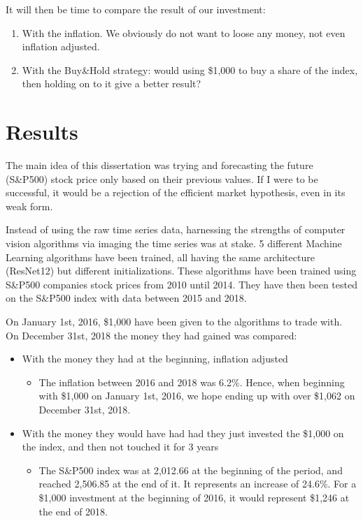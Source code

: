 \documentclass[11pt]{article}
\begin{document}
\begin{onehalfspace}
It will then be time to compare the result of our investment:

\begin{enumerate}
    \item With the inflation. We obviously do not want to loose any money, not even inflation adjusted.
    \item With the Buy\&Hold strategy: would using \$1,000 to buy a share of the index, then holding on to it give a better result?
\end{enumerate}

\pagebreak

\section{Results}
\label{results}

The main idea of this dissertation was trying and forecasting the future (S\&P500) stock price only based on their previous values. If I were to be successful, it would be a rejection of the efficient market hypothesis, even in its weak form. 

Instead of using the raw time series data, harnessing the strengths of computer vision algorithms via imaging the time series was at stake. 5 different Machine Learning algorithms have been trained, all having the same architecture (ResNet12) but different initializations. These algorithms have been trained using S\&P500 companies stock prices from 2010 until 2014. They have then been tested on the S\&P500 index with data between 2015 and 2018.

On January 1st, 2016, \$1,000 have been given to the algorithms to trade with. On December 31st, 2018 the money they had gained was compared:

\begin{itemize}
    \item With the money they had at the beginning, inflation adjusted
    \begin{itemize}
        \item The inflation between 2016 and 2018 was 6.2\%. Hence, when beginning with \$1,000 on January 1st, 2016, we hope ending up with over \$1,062 on December 31st, 2018.
    \end{itemize}
    \item With the money they would have had had they just invested the \$1,000 on the index, and then not touched it for 3 years
    \begin{itemize}
        \item The S\&P500 index was at 2,012.66 at the beginning of the period, and reached 2,506.85 at the end of it. It represents an increase of 24.6\%. For a \$1,000 investment at the beginning of 2016, it would represent \$1,246 at the end of 2018.
    \end{itemize}
\end{itemize}


\end{onehalfspace}
\end{document}
